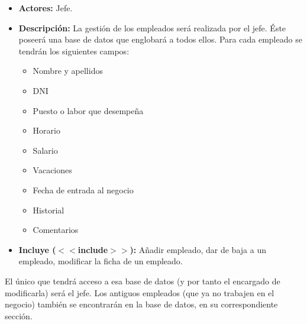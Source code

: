 \documentclass[spanish,a4paper,12pt]{report}		%
\begin{document}
\begin{itemize}
	\hspace{-2.2 true cm}	
		
			\begin{itemize}
			\item \textbf{Actores: }Jefe.
			\item \textbf{Descripción: }La gestión de los empleados será realizada por el jefe. Éste poseerá una base de datos que englobará a todos ellos. Para cada empleado se tendrán los siguientes campos:
				\begin{itemize}
				\item 	 Nombre y apellidos
				\item 	 DNI
				\item 	 Puesto o labor que desempeña
				\item 	 Horario
				\item 	 Salario
				\item 	 Vacaciones
				\item 	 Fecha de entrada al negocio
				\item 	 Historial
				\item 	 Comentarios
				\end {itemize}
			\item \textbf{Incluye ($<<$include$>>$):} Añadir empleado, dar de baja a un empleado, modificar la ficha de un empleado.
		\end {itemize}
El único que tendrá acceso a esa base de datos (y por tanto el encargado de modificarla) será el jefe. Los antiguos empleados (que ya no trabajen en el negocio) también se encontrarán en la base de datos, en su correspondiente sección.
		


\end{itemize}
\end{document}

